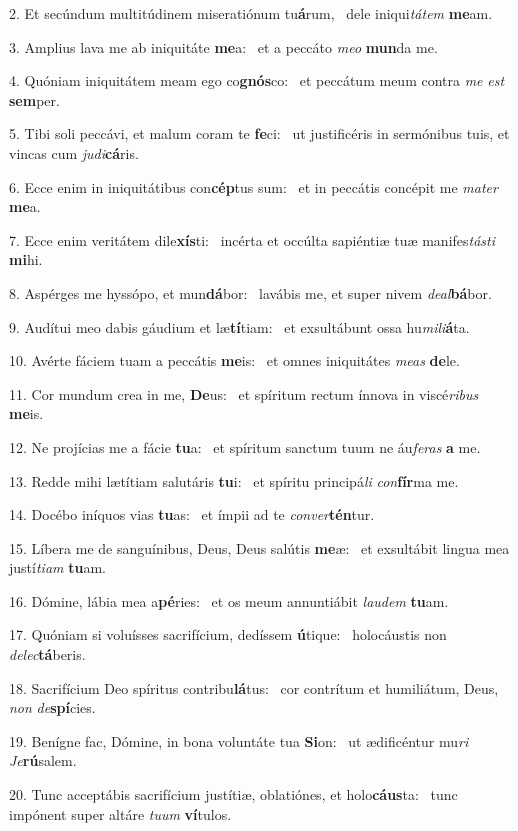 2. Et secúndum multitúdinem miseratiónum tu\textbf{á}rum, \ast\  dele iniqui\textit{tá}\textit{tem} \textbf{me}am.\

3. Amplius lava me ab iniquitáte \textbf{me}a: \ast\  et a peccáto \textit{me}\textit{o} \textbf{mun}da me.\

4. Quóniam iniquitátem meam ego co\textbf{gnós}co: \ast\  et peccátum meum contra \textit{me} \textit{est} \textbf{sem}per.\

5. Tibi soli peccávi, et malum coram te \textbf{fe}ci: \ast\  ut justificéris in sermónibus tuis, et vincas cum \textit{ju}\textit{di}\textbf{cá}ris.\

6. Ecce enim in iniquitátibus con\textbf{cép}tus sum: \ast\  et in peccátis concépit me \textit{ma}\textit{ter} \textbf{me}a.\

7. Ecce enim veritátem dile\textbf{xís}ti: \ast\  incérta et occúlta sapiéntiæ tuæ manifes\textit{tás}\textit{ti} \textbf{mi}hi.\

8. Aspérges me hyssópo, et mun\textbf{dá}bor: \ast\  lavábis me, et super nivem \textit{de}\textit{al}\textbf{bá}bor.\

9. Audítui meo dabis gáudium et læ\textbf{tí}tiam: \ast\  et exsultábunt ossa hu\textit{mi}\textit{li}\textbf{á}ta.\

10. Avérte fáciem tuam a peccátis \textbf{me}is: \ast\  et omnes iniquitátes \textit{me}\textit{as} \textbf{de}le.\

11. Cor mundum crea in me, \textbf{De}us: \ast\  et spíritum rectum ínnova in viscé\textit{ri}\textit{bus} \textbf{me}is.\

12. Ne projícias me a fácie \textbf{tu}a: \ast\  et spíritum sanctum tuum ne áu\textit{fe}\textit{ras} \textbf{a} me.\

13. Redde mihi lætítiam salutáris \textbf{tu}i: \ast\  et spíritu principá\textit{li} \textit{con}\textbf{fír}ma me.\

14. Docébo iníquos vias \textbf{tu}as: \ast\  et ímpii ad te \textit{con}\textit{ver}\textbf{tén}tur.\

15. Líbera me de sanguínibus, Deus, Deus salútis \textbf{me}æ: \ast\  et exsultábit lingua mea justí\textit{ti}\textit{am} \textbf{tu}am.\

16. Dómine, lábia mea a\textbf{pé}ries: \ast\  et os meum annuntiábit \textit{lau}\textit{dem} \textbf{tu}am.\

17. Quóniam si voluísses sacrifícium, dedíssem \textbf{ú}tique: \ast\  holocáustis non \textit{de}\textit{lec}\textbf{tá}beris.\

18. Sacrifícium Deo spíritus contribu\textbf{lá}tus: \ast\  cor contrítum et humiliátum, Deus, \textit{non} \textit{de}\textbf{spí}cies.\

19. Benígne fac, Dómine, in bona voluntáte tua \textbf{Si}on: \ast\  ut ædificéntur mu\textit{ri} \textit{Je}\textbf{rú}salem.\

20. Tunc acceptábis sacrifícium justítiæ, oblatiónes, et holo\textbf{cáus}ta: \ast\  tunc impónent super altáre \textit{tu}\textit{um} \textbf{ví}tulos.\

